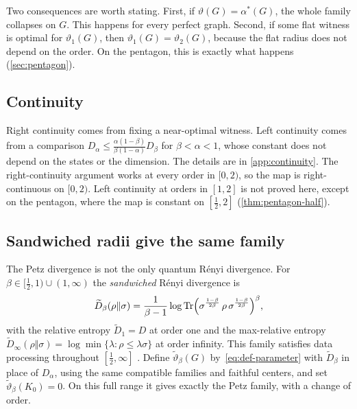 \documentclass[11pt]{article}
\newtheorem{proposition}[theorem]{Proposition}
\theoremstyle{definition}
\DeclareMathOperator{\Tr}{Tr}
\newcommand{\vt}{\vartheta}
\begin{document}
Two consequences are worth stating.  First, if $\vt(G)=\alpha^*(G)$, the
whole family collapses on $G$.  This happens for every perfect graph.  Second,
if some flat witness is optimal for $\vt_1(G)$, then $\vt_1(G)=\vt_2(G)$,
because the flat radius does not depend on the order.  On the pentagon, this
is exactly what happens (\cref{sec:pentagon}).

\subsection{Continuity}

\begin{proposition}\label[proposition]{prop:continuity}
For every graph $G$, the map $\alpha\mapsto\vt_\alpha(G)$ is continuous on
$[0,1)$.
\end{proposition}

Right continuity comes from fixing a near-optimal witness.  Left continuity
comes from a comparison $D_\alpha\le\frac{\alpha(1-\beta)}{\beta(1-\alpha)}D_\beta$
for $\beta<\alpha<1$, whose constant does not depend on the states or the
dimension.  The details are in \cref{app:continuity}.  The right-continuity
argument works at every order in $[0,2)$, so the map is right-continuous on
$[0,2)$.  Left continuity at orders in $[1,2]$ is not proved here, except on
the pentagon, where the map is constant on $[\frac12,2]$
(\cref{thm:pentagon-half}).

\subsection{Sandwiched radii give the same family}\label{sec:sandwiched}

The Petz divergence is not the only quantum R\'enyi divergence.  For
$\beta\in[\frac12,1)\cup(1,\infty)$ the \emph{sandwiched} R\'enyi divergence
\cite{MDSFT2013,WWY2014} is
\[
 \widetilde D_\beta(\rho\Vert\sigma)
 =\frac1{\beta-1}\log\Tr\Bigl(\sigma^{\frac{1-\beta}{2\beta}}\,\rho\,
   \sigma^{\frac{1-\beta}{2\beta}}\Bigr)^{\beta},
\]
with the relative entropy $\widetilde D_1=D$ at order one and the
max-relative entropy
$\widetilde D_\infty(\rho\Vert\sigma)=\log\min\{\lambda:\rho\le\lambda\sigma\}$
at order infinity.  This family satisfies data processing throughout
$[\frac12,\infty]$ \cite{FrankLieb2013,Beigi2013}.  Define
$\widetilde\vt_\beta(G)$
by~\eqref{eq:def-parameter} with $\widetilde D_\beta$ in place of $D_\alpha$,
using the same compatible families and faithful centers, and set
$\widetilde\vt_\beta(K_0)=0$.  On this full range it gives exactly the Petz
family, with a change of order.
\end{document}
